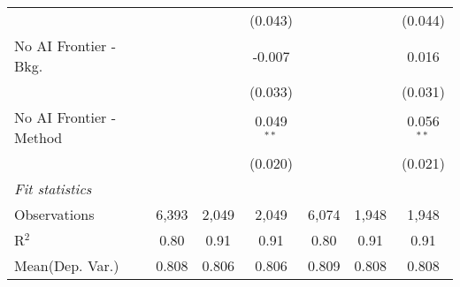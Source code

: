 \begin{tabular}{lcccccc}
                           &               &              & (0.043)       &               &         & (0.044)\\   
   No AI Frontier - Bkg.   &               &              & -0.007        &               &         & 0.016\\   
                           &               &              & (0.033)       &               &         & (0.031)\\   
   No AI Frontier - Method &               &              & 0.049$^{**}$  &               &         & 0.056$^{**}$\\   
                           &               &              & (0.020)       &               &         & (0.021)\\   
   \midrule
   \emph{Fit statistics}\\
   Observations            & 6,393         & 2,049        & 2,049         & 6,074         & 1,948   & 1,948\\  
   R$^2$                   & 0.80          & 0.91         & 0.91          & 0.80          & 0.91    & 0.91\\  
Mean(Dep. Var.) & 0.808 & 0.806 & 0.806 & 0.809 & 0.808 & 0.808 \\
   

\end{tabular}
